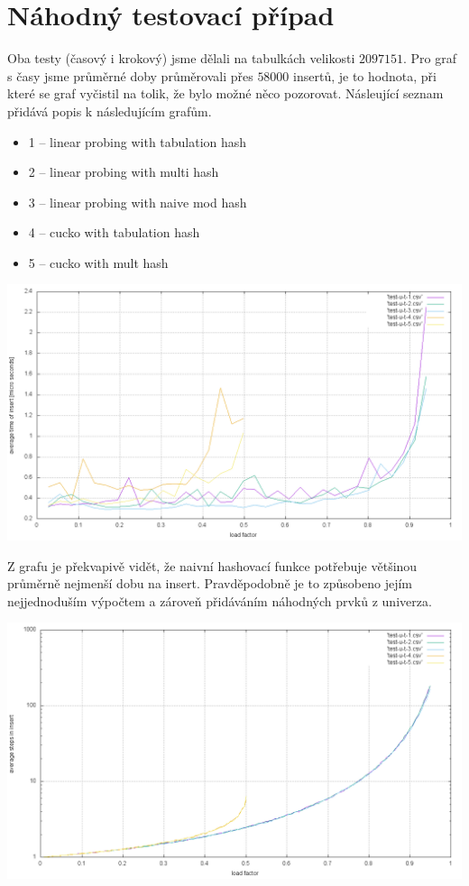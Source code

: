 \documentclass[12pt,a4paper]{report}
\begin{document}
\section{Náhodný testovací případ}
Oba testy (časový i krokový) jsme dělali na tabulkách velikosti $2097151$.
Pro graf s časy jsme průměrné doby průměrovali přes $58000$ insertů, je to hodnota,
při které se graf vyčistil na tolik, že bylo možné něco pozorovat. 
Násleující seznam přidává popis  k následujícím grafům.

\begin{itemize}
\item 1 -- linear probing with tabulation hash
\item 2 -- linear probing with multi hash
\item 3 -- linear probing with naive mod hash
\item 4 -- cucko with tabulation hash
\item 5 -- cucko with mult hash 
\end{itemize}
\includegraphics[width=\textwidth]{./tests/time_test/uniform-test.png}

Z grafu je překvapivě vidět, že naivní hashovací funkce potřebuje většinou
průměrně nejmenší dobu na insert. Pravděpodobně je to způsobeno jejím nejjednoduším výpočtem 
a zároveň přidáváním náhodných prvků z univerza.

\includegraphics[width=\textwidth]{./tests/steps_test/uniform-test.png}
\end{document}
